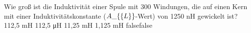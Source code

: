     {Wie groß ist die Induktivität einer Spule mit 300 Windungen, die auf einen Kern mit einer Induktivitätskonstante ($A\_\{\textrm\{L\}\}$-Wert) von 1250 nH gewickelt ist?}
    {112,5 mH}
    {112,5 μH}
    {11,25 mH}
    {1,125 mH}
    {false}{false}